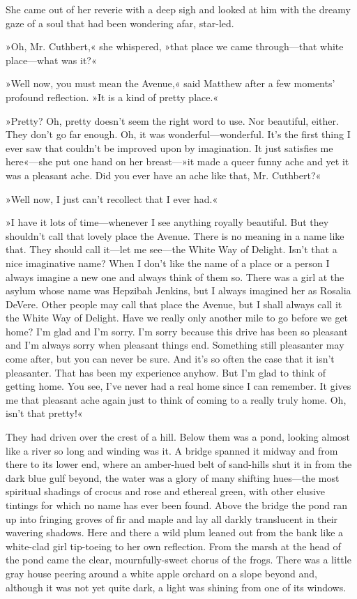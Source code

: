 She came out of her reverie with a deep sigh and looked at him with the dreamy gaze of a soul that had been wondering afar, star-led.

»Oh, Mr. Cuthbert,« she whispered, »that place we came through—that white place—what was it?«

»Well now, you must mean the Avenue,« said Matthew after a few moments’ profound reflection. »It is a kind of pretty place.«

»Pretty? Oh, pretty doesn’t seem the right word to use. Nor beautiful, either. They don’t go far enough. Oh, it was wonderful—wonderful. It’s the first thing I ever saw that couldn’t be improved upon by imagination. It just satisfies me here«—she put one hand on her breast—»it made a queer funny ache and yet it was a pleasant ache. Did you ever have an ache like that, Mr. Cuthbert?«

»Well now, I just can’t recollect that I ever had.«

»I have it lots of time—whenever I see anything royally beautiful. But they shouldn’t call that lovely place the Avenue. There is no meaning in a name like that. They should call it—let me see—the White Way of Delight. Isn’t that a nice imaginative name? When I don’t like the name of a place or a person I always imagine a new one and always think of them so. There was a girl at the asylum whose name was Hepzibah Jenkins, but I always imagined her as Rosalia DeVere. Other people may call that place the Avenue, but I shall always call it the White Way of Delight. Have we really only another mile to go before we get home? I’m glad and I’m sorry. I’m sorry because this drive has been so pleasant and I’m always sorry when pleasant things end. Something still pleasanter may come after, but you can never be sure. And it’s so often the case that it isn’t pleasanter. That has been my experience anyhow. But I’m glad to think of getting home. You see, I’ve never had a real home since I can remember. It gives me that pleasant ache again just to think of coming to a really truly home. Oh, isn’t that pretty!«

They had driven over the crest of a hill. Below them was a pond, looking almost like a river so long and winding was it. A bridge spanned it midway and from there to its lower end, where an amber-hued belt of sand-hills shut it in from the dark blue gulf beyond, the water was a glory of many shifting hues—the most spiritual shadings of crocus and rose and ethereal green, with other elusive tintings for which no name has ever been found. Above the bridge the pond ran up into fringing groves of fir and maple and lay all darkly translucent in their wavering shadows. Here and there a wild plum leaned out from the bank like a white-clad girl tip-toeing to her own reflection. From the marsh at the head of the pond came the clear, mournfully-sweet chorus of the frogs. There was a little gray house peering around a white apple orchard on a slope beyond and, although it was not yet quite dark, a light was shining from one of its windows.

